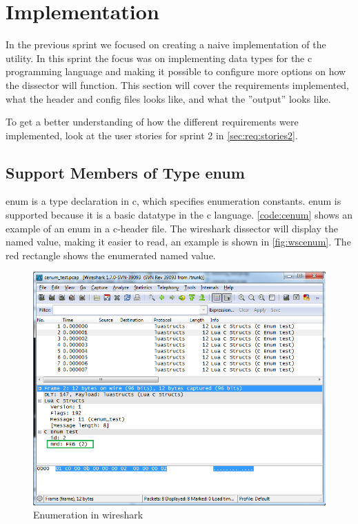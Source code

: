 \section{Implementation}

In the previous sprint we focused on creating a naive implementation of the 
\gls{utility}. In this sprint the focus was on implementing data types for the 
\Gls{c} programming language and making it possible to configure more options on how 
the \gls{dissector} will function. This section will cover the requirements 
implemented, what the \gls{header} and config files looks like, and what the ''output'' looks like.

To get a better understanding of how the different requirements were implemented,
look at the user stories for sprint 2 in \autoref{sec:req:stories2}.

\subsection{Support Members of Type \gls{enum}}

\label{sec:supportenum}
\Gls{enum} is a type declaration in \Gls{c}, which specifies enumeration constants.  \Gls{enum} 
is supported because it is a basic datatype in the \Gls{c} language. 
\autoref{code:cenum} shows an example of an \gls{enum} in a \Gls{c}-\gls{header} file. The 
\Gls{wireshark} \gls{dissector} will display the named value, making it 
easier to read, an example is shown in \autoref{fig:wscenum}. The red 
rectangle shows the \gls{enumerated named value}.

\begin{figure}[ht]
	\center
	\includegraphics[width=\textwidth]{./sprints/img/wireshark_cenum}
	\caption{Enumeration in \Gls{wireshark}\label{fig:wscenum}}
\end{figure}


